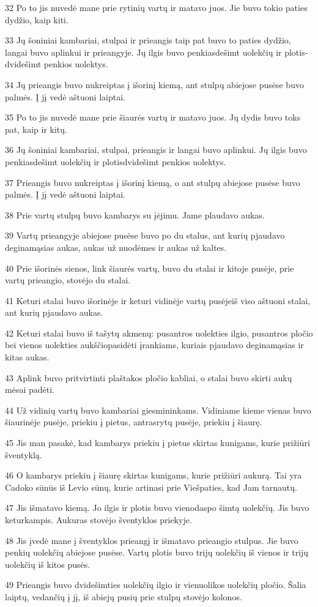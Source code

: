 \par 32 Po to jis nuvedė mane prie rytinių vartų ir matavo juos. Jie buvo tokio paties dydžio, kaip kiti. 
\par 33 Jų šoniniai kambariai, stulpai ir prieangis taip pat buvo to paties dydžio, langai buvo aplinkui ir prieangyje. Jų ilgis buvo penkiasdešimt uolekčių ir plotis­dvidešimt penkios uolektys. 
\par 34 Jų prieangis buvo nukreiptas į išorinį kiemą, ant stulpų abiejose pusėse buvo palmės. Į jį vedė aštuoni laiptai. 
\par 35 Po to jis nuvedė mane prie šiaurės vartų ir matavo juos. Jų dydis buvo toks pat, kaip ir kitų. 
\par 36 Jų šoniniai kambariai, stulpai, prieangis ir langai buvo aplinkui. Jų ilgis buvo penkiasdešimt uolekčių ir plotis­dvidešimt penkios uolektys. 
\par 37 Prieangis buvo nukreiptas į išorinį kiemą, o ant stulpų abiejose pusėse buvo palmės. Į jį vedė aštuoni laiptai. 
\par 38 Prie vartų stulpų buvo kambarys su įėjimu. Jame plaudavo aukas. 
\par 39 Vartų prieangyje abiejose pusėse buvo po du stalus, ant kurių pjaudavo deginamąsias aukas, aukas už nuodėmes ir aukas už kaltes. 
\par 40 Prie išorinės sienos, link šiaurės vartų, buvo du stalai ir kitoje pusėje, prie vartų prieangio, stovėjo du stalai. 
\par 41 Keturi stalai buvo išorinėje ir keturi vidinėje vartų pusėje­iš viso aštuoni stalai, ant kurių pjaudavo aukas. 
\par 42 Keturi stalai buvo iš tašytų akmenų: pusantros uolekties ilgio, pusantros pločio bei vienos uolekties aukščio­pasidėti įrankiams, kuriais pjaudavo deginamąsias ir kitas aukas. 
\par 43 Aplink buvo pritvirtinti plaštakos pločio kabliai, o stalai buvo skirti aukų mėsai padėti. 
\par 44 Už vidinių vartų buvo kambariai giesmininkams. Vidiniame kieme vienas buvo šiaurinėje pusėje, priekiu į pietus, antras­rytų pusėje, priekiu į šiaurę. 
\par 45 Jis man pasakė, kad kambarys priekiu į pietus skirtas kunigams, kurie prižiūri šventyklą. 
\par 46 O kambarys priekiu į šiaurę skirtas kunigams, kurie prižiūri aukurą. Tai yra Cadoko sūnūs iš Levio sūnų, kurie artinasi prie Viešpaties, kad Jam tarnautų. 
\par 47 Jis išmatavo kiemą. Jo ilgis ir plotis buvo vienodas­po šimtą uolekčių. Jis buvo keturkampis. Aukuras stovėjo šventyklos priekyje. 
\par 48 Jis įvedė mane į šventyklos prieangį ir išmatavo prieangio stulpus. Jie buvo penkių uolekčių abiejose pusėse. Vartų plotis buvo trijų uolekčių iš vienos ir trijų uolekčių iš kitos pusės. 
\par 49 Prieangis buvo dvidešimties uolekčių ilgio ir vienuolikos uolekčių pločio. Šalia laiptų, vedančių į jį, iš abiejų pusių prie stulpų stovėjo kolonos.



